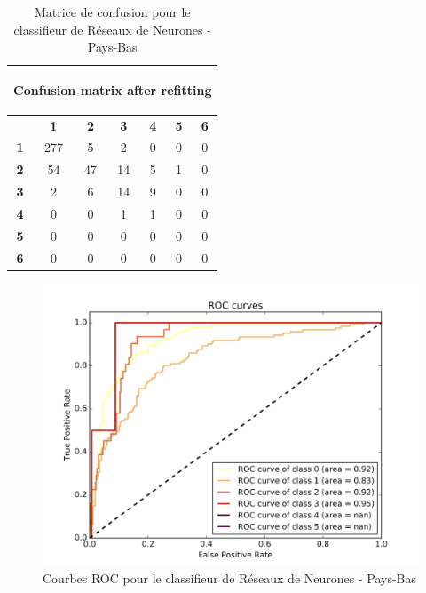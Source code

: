 \documentclass{book}
\begin{document}
\begin{table}[H]
  \begin{center}
  \begin{adjustbox}{max width=\textwidth}
  \begin{tabular}{|c|c|c|c|c|c|c|}
    \hline
    \multicolumn{7}{|c|}{{ \begin{bf}Confusion matrix after refitting\end{bf}}} \\
    \hline
     & \textbf{1} & \textbf{2} & \textbf{3} & \textbf{4} & \textbf{5} & \textbf{6}\\
    \hline
    \textbf{1} & 277 & 5 & 2 & 0 & 0 & 0\\
    \hline
    \textbf{2} & 54 & 47 & 14 & 5 & 1 & 0\\
    \hline
    \textbf{3} & 2 & 6 & 14 & 9 & 0 & 0\\
    \hline
    \textbf{4} & 0 & 0 & 1 & 1 & 0 & 0\\
    \hline
    \textbf{5} & 0 & 0 & 0 & 0 & 0 & 0\\
    \hline
    \textbf{6} & 0 & 0 & 0 & 0 & 0 & 0\\
    \hline
  \end{tabular}
  \end{adjustbox}
  \end{center}
  \caption{Matrice de confusion pour le classifieur de Réseaux de Neurones - Pays-Bas}
  \label{nn_cm_pays-bas}
\end{table}

\begin{figure}[H]
 \begin{center}
\includegraphics[scale=0.4]{../../data/Pays-Bas/test/Neural_Network_Classification-oversampling/Neural_Network_Classification-oversampling_roc.png}
 \end{center}
 \caption{Courbes ROC pour le classifieur de Réseaux de Neurones - Pays-Bas}
 \label{nn_roc_pays-bas}
\end{figure}
\end{document}
